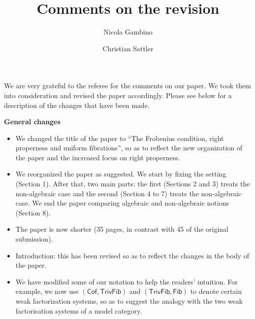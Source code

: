 \documentclass[reqno,10pt,a4paper,oneside,draft]{amsart}
\begin{document}
\title{Comments on the revision} 

\author{Nicola Gambino \and Christian Sattler} 

\maketitle

We are very grateful to the referee for the comments on our paper. We took them into consideration and revised the paper accordingly.  Please see below for a description of the changes that have been made.

{\bf General changes}
\begin{itemize} 
\item We changed the title of the paper to ``The Frobenius condition, right properness and uniform fibrations'', so as to reflect the new organization of
the paper and the increased focus on right properness. 
\item We reorganized the paper as suggested. We start 
by fixing the setting (Section 1). After that, two main parts: the first (Sections 2 and 3) treats the
non-algebraic case and the second (Section 4 to 7) treats the non-algebraic case.
We end the paper comparing algebraic and non-algebraic notions (Section 8). 
\item The paper is now shorter (35 pages, in contrast with 45 of the original submission).
\item Introduction: this has been revised so as to reflect the changes in the body of the paper.
\item We have modified some of our notation to help the readers' intuition. For example, we now use $(\mathsf{Cof}, \mathsf{TrivFib})$ and $(\mathsf{TrivFib}, \mathsf{Fib})$ to denote
certain weak factorization systems, so as to suggest the analogy with the two weak factorisation systems of a model category.
\end{itemize}
\end{document}
